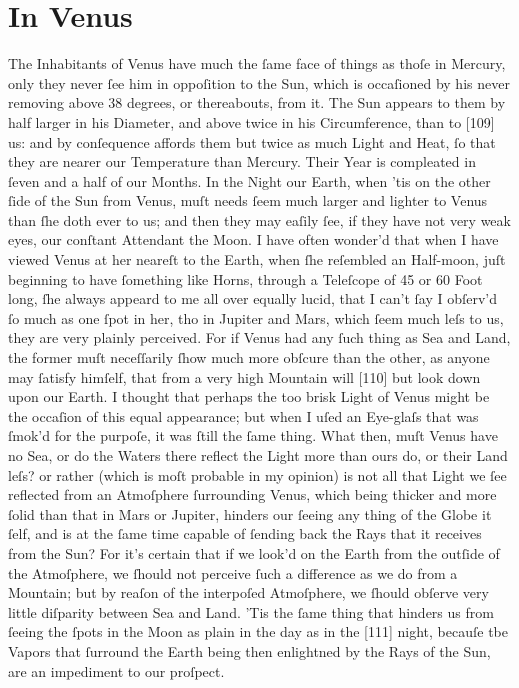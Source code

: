 \documentclass[letterpaper]{book}
\begin{document}
\section{In Venus}

The Inhabitants of Venus have much the ſame face of things as thoſe in
Mercury, only they never ſee him in oppoſition to the Sun, which is
occaſioned by his never removing above 38 degrees, or thereabouts, from it.
The Sun appears to them by half larger in his Diameter, and above twice in
his Circumference, than to [109] us: and by conſequence affords them but
twice as much Light and Heat, ſo that they are nearer our Temperature than
Mercury. Their Year is compleated in ſeven and a half of our Months. In
the Night our Earth, when 'tis on the other ſide of the Sun from Venus, muſt
needs ſeem much larger and lighter to Venus than ſhe doth ever to us; and
then they may eaſily ſee, if they have not very weak eyes, our conſtant Attendant the Moon. I have often wonder'd that when I have viewed Venus at her
neareſt to the Earth, when ſhe reſembled an Half-moon, juſt beginning to
have ſomething like Horns, through a Teleſcope of 45 or 60 Foot long, ſhe
always appeard to me all over equally lucid, that I can't ſay I obſerv'd ſo
much as one ſpot in her, tho in Jupiter and Mars, which ſeem much leſs to
us, they are very plainly perceived. For if Venus had any ſuch thing as Sea
and Land, the former muſt neceſſarily ſhow much more obſcure than the other,
as anyone may ſatisfy himſelf, that from a very high Mountain will [110] but
look down upon our Earth. I thought that perhaps the too brisk Light of
Venus might be the occaſion of this equal appearance; but when I uſed an
Eye-glaſs that was ſmok'd for the purpoſe, it was ſtill the ſame thing. What
then, muſt Venus have no Sea, or do the Waters there reflect the Light more
than ours do, or their Land leſs? or rather (which is moſt probable in my
opinion) is not all that Light we ſee reflected from an Atmoſphere
ſurrounding Venus, which being thicker and more ſolid than that in Mars or
Jupiter, hinders our ſeeing any thing of the Globe it ſelf, and is at the
ſame time capable of ſending back the Rays that it receives from the Sun?
For it's certain that if we look'd on the Earth from the outſide of the
Atmoſphere, we ſhould not perceive ſuch a difference as we do from a
Mountain; but by reaſon of the interpoſed Atmoſphere, we ſhould obſerve very
little diſparity between Sea and Land. 'Tis the ſame thing that hinders us
from ſeeing the ſpots in the Moon as plain in the day as in the [111] night,
becauſe tbe Vapors that ſurround the Earth being then enlightned by the Rays
of the Sun, are an impediment to our proſpect.
\end{document}
